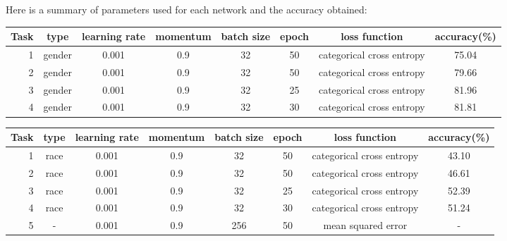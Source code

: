 \documentclass[12pt]{amsart}
\begin{document}
{	Here is a summary of parameters used for each network and the accuracy obtained:

	\begin{table}[h]
	\begin{tabular}{r c c c c c c c} 
	\hline
	Task & type & learning rate & momentum & batch size & epoch & loss function & accuracy(\%) \\
	\hline
	1 & gender & 0.001 & 0.9 & 32 & 50 & categorical cross entropy & 75.04 \\
	
	2 & gender & 0.001 & 0.9 & 32 & 50 & categorical cross entropy & 79.66 \\
	
	3 & gender & 0.001 & 0.9 & 32 & 25 & categorical cross entropy & 81.96\\
	
	4 & gender & 0.001 & 0.9 & 32 & 30 & categorical cross entropy & 81.81 \\
	\hline
	\end{tabular}
	\end{table}

	\begin{table}[h]
	\begin{tabular}{r c c c c c c c} 
	\hline
	Task & type & learning rate & momentum & batch size & epoch & loss function & accuracy(\%) \\
	\hline
	1& race  & 0.001 & 0.9 & 32 & 50 & categorical cross entropy & 43.10 \\
	2& race  & 0.001 & 0.9 & 32 & 50 & categorical cross entropy & 46.61\\
	3& race  & 0.001 & 0.9 & 32 & 25 & categorical cross entropy & 52.39 \\
	4& race  & 0.001 & 0.9 & 32 & 30 & categorical cross entropy & 51.24 \\

	5 & - & 0.001 & 0.9 & 256 & 50 & mean squared error & - \\
	\hline
	\end{tabular}
	\end{table}

	\vfill 

}
\end{document}

